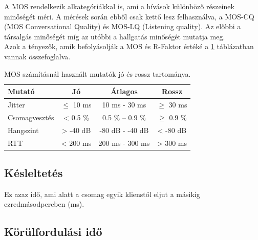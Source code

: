 
%

A MOS rendelkezik alkategóriákkal is, ami a hívások különböző részeinek minőségét méri. A 
mérések során ebből csak kettő lesz felhasználva, a MOS-CQ (MOS Conversational Quality) és 
MOS-LQ (Listening quality). Az előbbi a társalgás minőségét míg az utóbbi a hallgatás minőségét
mutatja meg. \\

Azok a tényezők, amik befolyásolják a MOS és R-Faktor értéké a \ref{tab:values} táblázatban
vannak összefoglalva. 

\begin{table}[H]
	\footnotesize
	\centering
	\begin{tabular}{ l c c c}
		\toprule
		Mutató & Jó & Átlagos & Rossz\\
		\midrule
		Jitter & $\leq$ 10 ms & 10 ms - 30 ms & $\geq$ 30 ms\\
		Csomagvesztés & < 0.5 \%  & 0.5 \% – 0.9 \% & $\geq$ 0.9 \%\\
		Hangszint & > -40 dB & -80 dB - -40 dB & < -80 dB\\
		RTT & < 200 ms & 200 ms - 300 ms & > 300 ms\\
		\bottomrule
	\end{tabular}
	\caption{MOS számításnál használt mutatók jó és rossz tartománya.}
	\label{tab:values}
\end{table}


\subsection{Késleltetés}

Ez azaz idő, ami alatt a csomag egyik klienstől eljut a másikig ezredmásodpercben (ms). 

\subsection{Körülfordulási idő}

